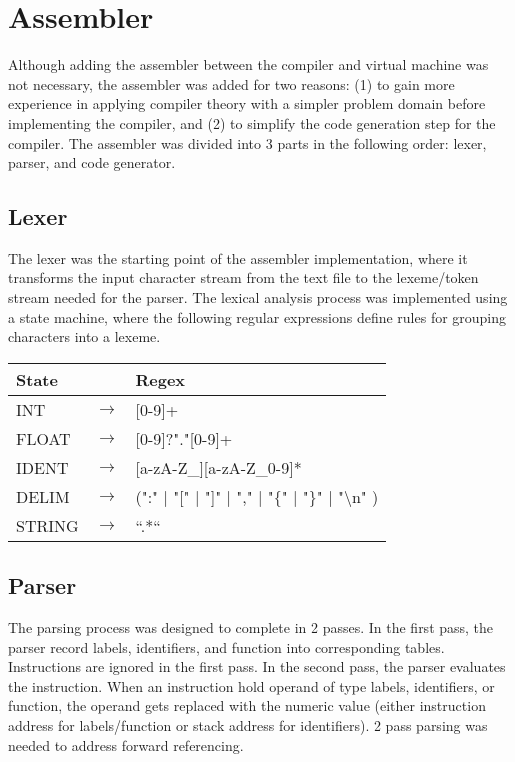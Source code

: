 \documentclass[manuscript,screen,nonacm]{acmart}
\begin{document}
\section{Assembler}
Although adding the assembler between the compiler and virtual machine was not necessary, the assembler was added for two reasons: (1) to gain more experience in applying compiler theory with a simpler problem domain before implementing the compiler, and (2) to simplify the code generation step for the compiler. The assembler was divided into 3 parts in the following order: lexer, parser, and code generator.

\subsection{Lexer}
The lexer was the starting point of the assembler implementation, where it transforms the input character stream from the text file to the lexeme/token stream needed for the parser. The lexical analysis process was implemented using a state machine, where the following regular expressions define rules for grouping characters into a lexeme.

\begin{center}
\begin{tabular}{l l l}
    \hline
    State & & Regex \\
    \hline
    INT & $\rightarrow$ & [0-9]+ \\
    FLOAT & $\rightarrow$ & [0-9]?"."[0-9]+ \\
    IDENT & $\rightarrow$ & [a-zA-Z\_][a-zA-Z\_0-9]* \\
    DELIM & $\rightarrow$ & (":" | "[" | "]" | "," | "$\{$" | "$\}$" | "\textbackslash n" ) \\
    STRING & $\rightarrow$ & ``.*`` \\
    \hline
\end{tabular}
\end{center}

\subsection{Parser}
The parsing process was designed to complete in 2 passes. In the first pass, the parser record labels, identifiers, and function into corresponding tables. Instructions are ignored in the first pass. In the second pass, the parser evaluates the instruction. When an instruction hold operand of type labels, identifiers, or function, the operand gets replaced with the numeric value (either instruction address for labels/function or stack address for identifiers). 2 pass parsing was needed to address forward referencing.
\end{document}
